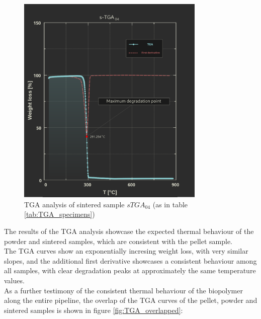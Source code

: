 \documentclass{article}
\begin{document}
            \begin{figure}[h!]
                \centering
                \includegraphics[width=0.8\textwidth]{Pictures/Thermal_analysis_plots/TGA_catalogued/Fixed/s-TGA04.pdf}
                \caption{TGA analysis of sintered sample $sTGA_{04}$ (as in table \ref{tab:TGA_specimens})}
                \label{fig:TGA_04}
            \end{figure}

            \clearpage

            The results of the TGA analysis showcase the expected thermal behaviour of the powder and sintered samples,
            which are consistent with the pellet sample. \\ 

            The TGA curves show an exponentially incresing weight loss, with very similar slopes, and the additional 
            first derivative showcases a consistent behaviour among all samples, with clear degradation peaks at approximately 
            the same temperature values. \\ 

            As a further testimony of the consistent thermal behaviour of the biopolymer along the entire pipeline, the overlap of the
            TGA curves of the pellet, powder and sintered samples is shown in figure \ref{fig:TGA_overlapped}:
\end{document}
